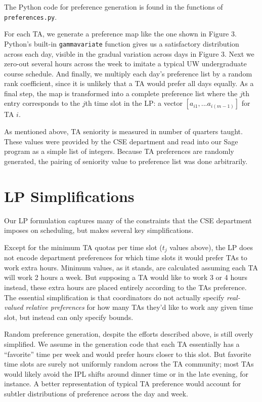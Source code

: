 \documentclass{article}
\begin{document}
\begin{multicols}{2}
The Python code for preference generation is found in the functions of \texttt{preferences.py}.

For each TA, we generate a preference map like the one shown in Figure 3. Python's built-in \texttt{gammavariate} function gives us a satisfactory distribution across each day, visible in the gradual variation across days in Figure 3. Next we zero-out several hours across the week to imitate a typical UW undergraduate course schedule. And finally, we multiply each day's preference list by a random rank coefficient, since it is unlikely that a TA would prefer all days equally. As a final step, the map is transformed into a complete preference list where the $j$th entry corresponds to the $j$th time slot in the LP: a vector $[a_{i1}, ... a_{i(m-1)}]$ for TA $i$.

As mentioned above, TA seniority is measured in number of quarters taught. These values were provided by the CSE department and read into our Sage program as a simple list of integers. Because TA preferences are randomly generated, the pairing of seniority value to preference list was done arbitrarily.

\section*{LP Simplifications}

Our LP formulation captures many of the constraints that the CSE department imposes on scheduling, but makes several key simplifications.

Except for the minimum TA quotas per time slot ($t_j$ values above), the LP does not encode department preferences for which time slots it would prefer TAs to work extra hours. Minimum values, as it stands, are calculated assuming each TA will work 2 hours a week. But supposing a TA would like to work 3 or 4 hours instead, these extra hours are placed entirely according to the TAs preference. The essential simplification is that coordinators do not actually specify \textit{real-valued relative preferences} for how many TAs they'd like to work any given time slot, but instead can only specify bounds.

Random preference generation, despite the efforts described above, is still overly simplified. We assume in the generation code that each TA essentially has a ``favorite'' time per week and would prefer hours closer to this slot. But favorite time slots are surely not uniformly random across the TA community; most TAs would likely avoid the IPL shifts around dinner time or in the late evening, for instance. A better representation of typical TA preference would account for subtler distributions of preference across the day and week.


\end{multicols}
\end{document}
